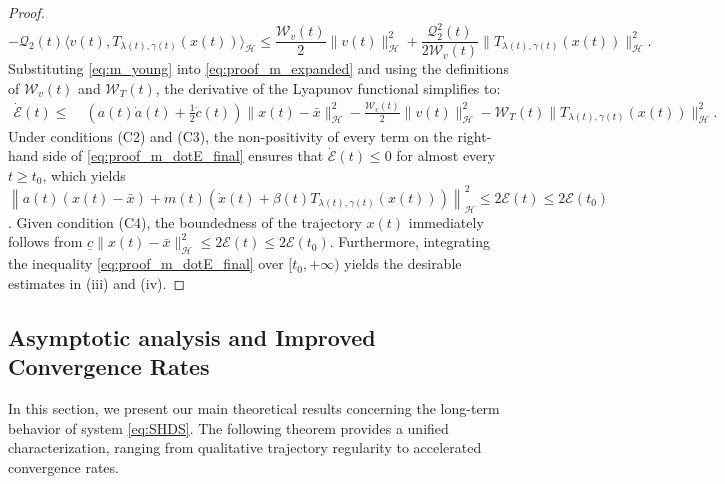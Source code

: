 \documentclass{article}
\theoremstyle{definition}
\theoremstyle{definition}
\theoremstyle{definition}
\begin{document}
\begin{proof}
\begin{equation}\label{eq:m_young}
-\mathcal{Q}_2(t) \langle v(t), T_{\lambda(t), \gamma(t)}(x(t)) \rangle_{\mathcal{H}} \le \frac{\mathcal{W}_v(t)}{2} \|v(t)\|_{\mathcal{H}}^2 + \frac{\mathcal{Q}_2^2(t)}{2 \mathcal{W}_v(t)} \|T_{\lambda(t), \gamma(t)}(x(t))\|_{\mathcal{H}}^2.
\end{equation}
Substituting \eqref{eq:m_young} into \eqref{eq:proof_m_expanded} and using the definitions of $\mathcal{W}_v(t)$ and $\mathcal{W}_T(t)$, the derivative of the Lyapunov functional simplifies to:
\begin{align}
\dot{\mathcal{E}}(t) \le \;& \left( a(t)\dot{a}(t) + \frac{1}{2}\dot{c}(t) \right)\|x(t) - \bar{x}\|_{\mathcal{H}}^2 - \frac{\mathcal{W}_v(t)}{2}\|v(t)\|_{\mathcal{H}}^2 - \mathcal{W}_T(t)\|T_{\lambda(t), \gamma(t)}(x(t))\|_{\mathcal{H}}^2. \label{eq:proof_m_dotE_final}
\end{align}
Under conditions (C2) and (C3), the non-positivity of every term on the right-hand side of \eqref{eq:proof_m_dotE_final} ensures that $\dot{\mathcal{E}}(t) \le 0$ for almost every $t \ge t_0$, which yields $\left\| a(t) \left( x(t) - \bar{x} \right) + m(t) \left( \dot{x}(t) + \beta(t) T_{\lambda(t), \gamma(t)}(x(t)) \right) \right\|_{\mathcal{H}}^2 \le 2\mathcal{E}(t) \le 2\mathcal{E}(t_0)$. Given condition (C4), the boundedness of the trajectory $x(t)$ immediately follows from $\underline{c}\|x(t) - \bar{x}\|_{\mathcal{H}}^2 \le 2\mathcal{E}(t) \le 2\mathcal{E}(t_0)$. Furthermore, integrating the inequality \eqref{eq:proof_m_dotE_final} over $[t_0, +\infty)$ yields the desirable estimates in (iii) and (iv).
\end{proof}

\subsection{Asymptotic analysis and Improved Convergence Rates}
In this section, we present our main theoretical results concerning the long-term behavior of system \eqref{eq:SHDS}. The following theorem provides a unified characterization, ranging from qualitative trajectory regularity to accelerated convergence rates.
\end{document}
